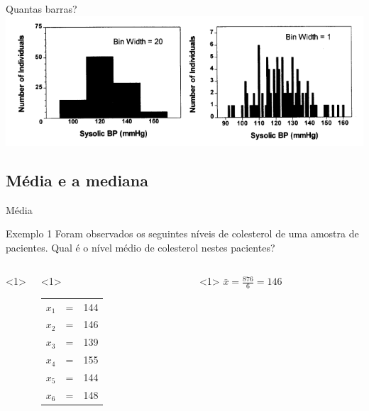 \documentclass{beamer}
\begin{document}
\begin{frame}{\scriptsize Quantas barras?}
  \includegraphics[width=\textwidth]{Cap3/histograma2}
\end{frame}

\subsection{Média e a mediana}

\begin{frame}{\scriptsize Média}
  \begin{exampleblock}{Exemplo 1}
    \footnotesize
    Foram observados os seguintes níveis de colesterol de uma amostra
    de pacientes. Qual é o nível médio de colesterol nestes pacientes?

    \bigskip
    \begin{columns}<1>
      \begin{column}{5cm}<1>
        {\tiny
        \begin{tabular}{ccc}
          $x_1$ &=&144\\
          $x_2$ &=&146\\
          $x_3$ &=&139\\
          $x_4$ &=&155\\
          $x_5$ &=&144\\
          $x_6$ &=&148\\
        \end{tabular}
        }
      \end{column}
      \begin{column}{5cm}<1>
        \scriptsize
        $\bar{x} = \frac{876}{6} = 146 $
      \end{column}
    \end{columns}
  \end{exampleblock}
\end{frame}
\end{document}
